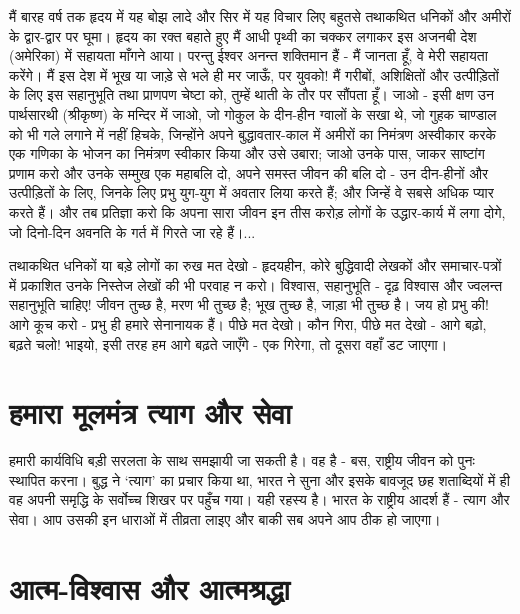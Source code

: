 मैं बारह वर्ष तक हृदय में यह बोझ लादे और सिर में यह विचार लिए बहुतसे तथाकथित धनिकों और अमीरों के द्वार-द्वार पर घूमा। हृदय का रक्त बहाते हुए मैं आधी पृथ्वी का चक्कर लगाकर इस अजनबी देश (अमेरिका) में सहायता माँगने आया। परन्तु ईश्वर अनन्त शक्तिमान हैं - मैं जानता हूँ, वे मेरी सहायता करेंगे। मैं इस देश में भूख या जाड़े से भले ही मर जाऊँ, पर युवको! मैं गरीबों, अशिक्षितों और उत्पीड़ितों के लिए इस सहानुभूति तथा प्राणपण चेष्टा को, तुम्हें थाती के तौर पर सौंपता हूँ। जाओ - इसी क्षण उन पार्थसारथी (श्रीकृष्ण) के मन्दिर में जाओ, जो गोकुल के दीन-हीन ग्वालों के सखा थे, जो गुहक चाण्डाल को भी गले लगाने में नहीं हिचके, जिन्होंने अपने बुद्धावतार-काल में अमीरों का निमंत्रण अस्वीकार करके एक गणिका के भोजन का निमंत्रण स्वीकार किया और उसे उबारा; जाओ उनके पास, जाकर साष्टांग प्रणाम करो और उनके सम्मुख एक महाबलि दो, अपने समस्त जीवन की बलि दो - उन दीन-हीनों और उत्पीड़ितों के लिए, जिनके लिए प्रभु युग-युग में अवतार लिया करते हैं; और जिन्हें वे सबसे अधिक प्यार करते हैं। और तब प्रतिज्ञा करो कि अपना सारा जीवन इन तीस करोड़ लोगों के उद्धार-कार्य में लगा दोगे, जो दिनो-दिन अवनति के गर्त में गिरते जा रहे हैं।... 

तथाकथित धनिकों या बड़े लोगों का रुख मत देखो - हृदयहीन, कोरे बुद्धिवादी लेखकों और समाचार-पत्रों में प्रकाशित उनके निस्तेज लेखों की भी परवाह न करो। विश्वास, सहानुभूति - दृढ़ विश्वास और ज्वलन्त सहानुभूति चाहिए! जीवन तुच्छ है, मरण भी तुच्छ है; भूख तुच्छ है, जाड़ा भी तुच्छ है। जय हो प्रभु की! आगे कूच करो - प्रभु ही हमारे सेनानायक हैं। पीछे मत देखो। कौन गिरा, पीछे मत देखो - आगे बढ़ो, बढ़ते चलो! भाइयो, इसी तरह हम आगे बढ़ते जाएँगे - एक गिरेगा, तो दूसरा वहाँ डट जाएगा।


\section*{हमारा मूलमंत्र त्याग और सेवा}


हमारी कार्यविधि बड़ी सरलता के साथ समझायी जा सकती है। वह है - बस, राष्ट्रीय जीवन को पुनः स्थापित करना। बुद्ध ने ‘त्याग’ का प्रचार किया था, भारत ने सुना और इसके बावजूद छह शताब्दियों में ही वह अपनी समृद्धि के सर्वोच्च शिखर पर पहुँच गया। यही रहस्य है। भारत के राष्ट्रीय आदर्श हैं - त्याग और सेवा। आप उसकी इन धाराओं में तीव्रता लाइए और बाकी सब अपने आप ठीक हो जाएगा।


\section*{आत्म-विश्वास और आत्मश्रद्धा}

